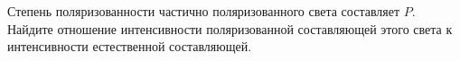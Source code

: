 \documentclass[__main__.tex]{subfiles}
\begin{document}
Степень поляризованности частично поляризованного света составляет $P$. Найдите отношение интенсивности поляризованной составляющей этого света к интенсивности естественной составляющей.\\ 

\end{document}
